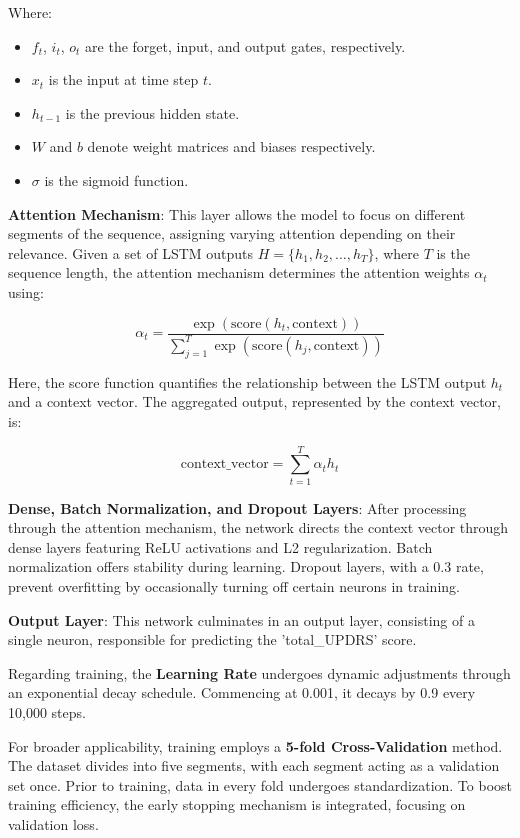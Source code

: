 Where:
\begin{itemize}
\item $f_t$, $i_t$, $o_t$ are the forget, input, and output gates, respectively.
\item $x_t$ is the input at time step $t$.
\item $h_{t-1}$ is the previous hidden state.
\item $W$ and $b$ denote weight matrices and biases respectively.
\item $\sigma$ is the sigmoid function.
\end{itemize}

\textbf{Attention Mechanism}: This layer allows the model to focus on different segments of the sequence, assigning varying attention depending on their relevance. Given a set of LSTM outputs $H = \{h_1, h_2, \dots, h_T\}$, where $T$ is the sequence length, the attention mechanism determines the attention weights $\alpha_t$ using:

\begin{equation}
\alpha_t = \frac{\exp(\text{score}(h_t, \text{context}))}{\sum_{j=1}^{T} \exp(\text{score}(h_j, \text{context}))}
\end{equation}

Here, the score function quantifies the relationship between the LSTM output $h_t$ and a context vector. The aggregated output, represented by the context vector, is:

\begin{equation}
\text{context\_vector} = \sum_{t=1}^{T} \alpha_t h_t
\end{equation}

\textbf{Dense, Batch Normalization, and Dropout Layers}: After processing through the attention mechanism, the network directs the context vector through dense layers featuring ReLU activations and L2 regularization. Batch normalization offers stability during learning. Dropout layers, with a 0.3 rate, prevent overfitting by occasionally turning off certain neurons in training.

\textbf{Output Layer}: This network culminates in an output layer, consisting of a single neuron, responsible for predicting the 'total\_UPDRS' score.

Regarding training, the \textbf{Learning Rate} undergoes dynamic adjustments through an exponential decay schedule. Commencing at 0.001, it decays by 0.9 every 10,000 steps.

For broader applicability, training employs a \textbf{5-fold Cross-Validation} method. The dataset divides into five segments, with each segment acting as a validation set once. Prior to training, data in every fold undergoes standardization. To boost training efficiency, the early stopping mechanism is integrated, focusing on validation loss.

